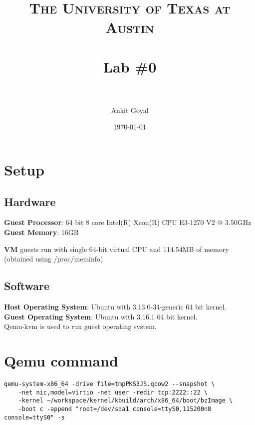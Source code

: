 \documentclass[paper=a4, fontsize=11pt]{scrartcl} %
\title{	
\normalfont \normalsize 
\textsc{The University of Texas at Austin} \\ [25pt] %
\horrule{0.5pt} \\[0.4cm] %
\huge Lab \#0 \\ %
\horrule{2pt} \\[0.5cm] %
}
\author{Ankit Goyal} %
\date{\normalsize\today} %
\numberwithin{equation}{section} %
\numberwithin{figure}{section} %
\numberwithin{table}{section} %
\begin{document}
\maketitle %


\section{Setup}
\subsection{Hardware}
\textbf{Guest Processor}: 64 bit 8 core Intel(R) Xeon(R) CPU E3-1270 V2 @ 3.50GHz\\
\textbf{Guest Memory}: 16GB

\textbf{VM} guests run with single 64-bit virtual CPU and 114.54MB of memory (obtained using /proc/meminfo)

\subsection{Software}
\textbf{Host Operating System}: Ubuntu with 3.13.0-34-generic 64 bit kernel.\\
\textbf{Guest Operating System}: Ubuntu with 3.16.1 64 bit kernel.\\

Qemu-kvm is used to run guest operating system. 


\section{Qemu command}
\begin{verbatim}
qemu-system-x86_64 -drive file=tmpPKS3JS.qcow2 --snapshot \
	-net nic,model=virtio -net user -redir tcp:2222::22 \
	-kernel ~/workspace/kernel/kbuild/arch/x86_64/boot/bzImage \
	-boot c -append "root=/dev/sda1 console=ttyS0,115200n8 console=ttyS0" -s  
\end{verbatim}

\end{document}
